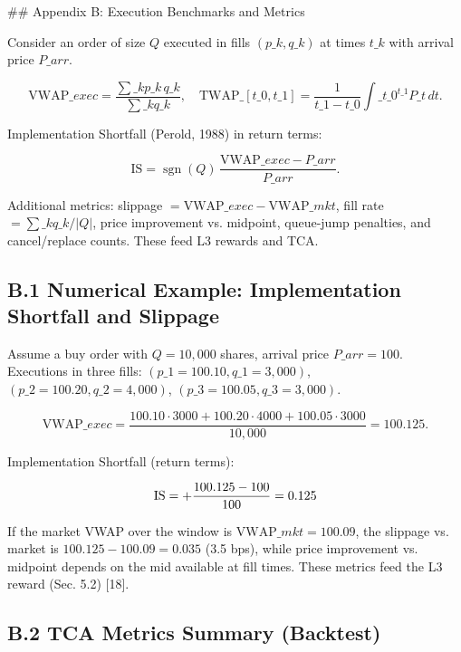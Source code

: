\documentclass[11pt,a4paper]{article}
\begin{document}
\#\# Appendix B: Execution Benchmarks and Metrics

Consider an order of size $Q$ executed in fills $(p\_k, q\_k)$ at times $t\_k$ with arrival price $P\_{arr}$.

\begin{equation}
\mathrm{VWAP}\_{exec} = \frac{\sum\_k p\_k\,q\_k}{\sum\_k q\_k},\quad \mathrm{TWAP}\_{[t\_0,t\_1]} = \frac{1}{t\_1-t\_0}\int\_{t\_0}^{t\_1} P\_t\,dt.
\end{equation}

Implementation Shortfall (Perold, 1988) in return terms:

\begin{equation}
\mathrm{IS} = \operatorname{sgn}(Q)\,\frac{\mathrm{VWAP}\_{exec}-P\_{arr}}{P\_{arr}}.
\end{equation}

Additional metrics: slippage $= \mathrm{VWAP}\_{exec}-\mathrm{VWAP}\_{mkt}$, fill rate $= \sum\_k q\_k/|Q|$, price improvement vs. midpoint, queue-jump penalties, and cancel/replace counts. These feed L3 rewards and TCA.

\subsection{B.1 Numerical Example: Implementation Shortfall and Slippage}

Assume a buy order with $Q=10,000$ shares, arrival price $P\_{arr}=100$. Executions in three fills: $(p\_1=100.10, q\_1=3,000)$, $(p\_2=100.20, q\_2=4,000)$, $(p\_3=100.05, q\_3=3,000)$.

\begin{equation}
\mathrm{VWAP}\_{exec} = \frac{100.10\cdot 3000 + 100.20\cdot 4000 + 100.05\cdot 3000}{10,000} = 100.125.
\end{equation}

Implementation Shortfall (return terms):

\begin{equation}
\mathrm{IS} = +\frac{100.125-100}{100} = 0.125\\%
\end{equation}

If the market VWAP over the window is $\mathrm{VWAP}\_{mkt}=100.09$, the slippage vs. market is $100.125-100.09=0.035$ (3.5 bps), while price improvement vs. midpoint depends on the mid available at fill times. These metrics feed the L3 reward (Sec. 5.2) [18].

\subsection{B.2 TCA Metrics Summary (Backtest)}
\end{document}
